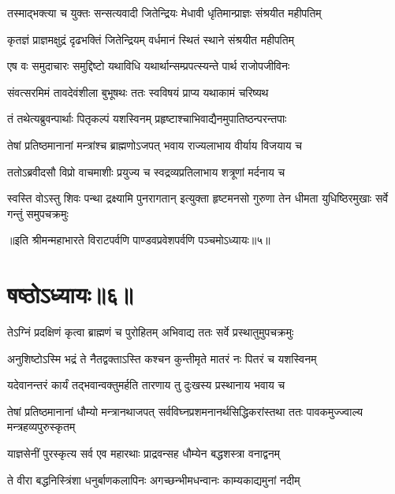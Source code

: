 \twolineshloka
{तस्माद्भक्त्या च युक्तः सन्सत्यवादी जितेन्द्रियः}
{मेधावी धृतिमान्प्राज्ञः संश्रयीत महीपतिम्}


\twolineshloka
{कृतज्ञं प्राज्ञमक्षुद्रं दृढभक्तिं जितेन्द्रियम्}
{वर्धमानं स्थितं स्थाने संश्रयीत महीपतिम्}


\twolineshloka
{एष वः समुदाचारः समुद्दिष्टो यथाविधि}
{यथार्थान्सम्प्रपत्स्यन्ते पार्थ राजोपजीविनः}


\twolineshloka
{संवत्सरमिमं तावदेवंशीला बुभूषथः}
{ततः स्वविषयं प्राप्य यथाकामं चरिष्यथ}



\twolineshloka
{तं तथेत्यब्रुवन्पार्थाः पितृकल्पं यशस्विनम्}
{प्रहृष्टाश्चाभिवाद्यैनमुपातिष्ठन्परन्तपाः}


\twolineshloka
{तेषां प्रतिष्ठमानानां मन्त्रांश्च ब्राह्मणोऽजपत्}
{भवाय राज्यलाभाय वीर्याय विजयाय च}


\twolineshloka
{ततोऽब्रवीदसौ विप्रो वाचमाशीः प्रयुज्य च}
{स्वद्रव्यप्रतिलाभाय शत्रूणां मर्दनाय च}


\threelineshloka
{स्वस्ति वोऽस्तु शिवः पन्था द्रक्ष्यामि पुनरागतान्}
{इत्युक्ता हृष्टमनसो गुरुणा तेन धीमता}
{युधिष्ठिरमुखाः सर्वे गन्तुं समुपचक्रमुः}

॥इति श्रीमन्महाभारते विराटपर्वणि पाण्डवप्रवेशपर्वणि पञ्चमोऽध्यायः॥५॥

\chapter{षष्ठोऽध्यायः॥६॥}

\twolineshloka
{तेऽग्निं प्रदक्षिणं कृत्वा ब्राह्मणं च पुरोहितम्}
{अभिवाद्य ततः सर्वे प्रस्थातुमुपचक्रमुः}




\twolineshloka
{अनुशिष्टोऽस्मि भद्रं ते नैतद्वक्ताऽस्ति कश्चन}
{कुन्तीमृते मातरं नः पितरं च यशस्विनम्}


\twolineshloka
{यदेवानन्तरं कार्यं तद्भवान्वक्तुमर्हति}
{तारणाय तु दुःखस्य प्रस्थानाय भवाय च}



\threelineshloka
{तेषां प्रतिष्ठमानानां धौम्यो मन्त्रानथाजपत्}
{सर्वविघ्नप्रशमनानर्थसिद्धिकरांस्तथा}
{ततः पावकमुज्ज्वाल्य मन्त्रहव्यपुरुस्कृतम्}


\twolineshloka
{याज्ञसेनीं पुरस्कृत्य सर्व एव महारथाः}
{प्राद्रवन्सह धौम्येन बद्धशस्त्रा वनाद्वनम्}


\twolineshloka
{ते वीरा बद्धनिस्त्रिंशा धनुर्बाणकलापिनः}
{अगच्छन्भीमधन्वानः काम्यकाद्यमुनां नदीम्}


